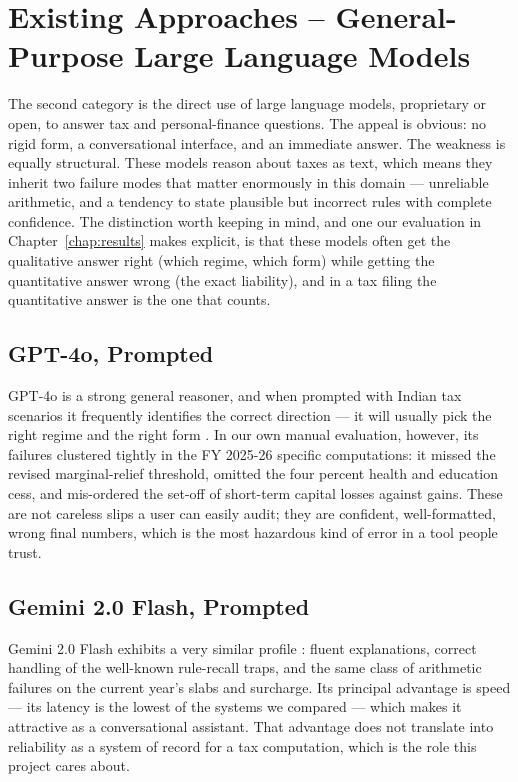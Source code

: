 \section{Existing Approaches -- General-Purpose Large Language Models}
\label{sec:category-b}

The second category is the direct use of large language models, proprietary or
open, to answer tax and personal-finance questions. The appeal is obvious: no
rigid form, a conversational interface, and an immediate answer. The weakness is
equally structural. These models reason about taxes as text, which means they
inherit two failure modes that matter enormously in this domain --- unreliable
arithmetic, and a tendency to state plausible but incorrect rules with complete
confidence. The distinction worth keeping in mind, and one our evaluation in
Chapter~\ref{chap:results} makes explicit, is that these models often get the
qualitative answer right (which regime, which form) while getting the
quantitative answer wrong (the exact liability), and in a tax filing the
quantitative answer is the one that counts.

\subsection{GPT-4o, Prompted}
GPT-4o is a strong general reasoner, and when prompted with Indian tax scenarios
it frequently identifies the correct direction --- it will usually pick the
right regime and the right form \cite{ref4}. In our own manual evaluation,
however, its failures clustered tightly in the FY 2025-26 specific computations:
it missed the revised marginal-relief threshold, omitted the four percent health
and education cess, and mis-ordered the set-off of short-term capital losses
against gains. These are not careless slips a user can easily audit; they are
confident, well-formatted, wrong final numbers, which is the most hazardous kind
of error in a tool people trust.

\subsection{Gemini 2.0 Flash, Prompted}
Gemini 2.0 Flash exhibits a very similar profile \cite{ref5}: fluent
explanations, correct handling of the well-known rule-recall traps, and the same
class of arithmetic failures on the current year's slabs and surcharge. Its
principal advantage is speed --- its latency is the lowest of the systems we
compared --- which makes it attractive as a conversational assistant. That
advantage does not translate into reliability as a system of record for a tax
computation, which is the role this project cares about.

